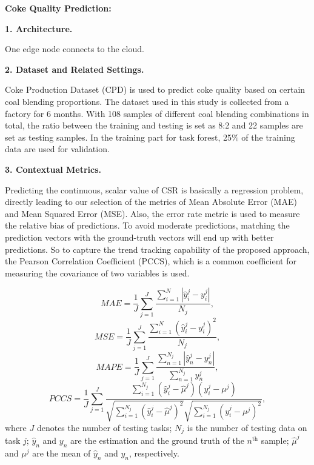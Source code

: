 \textbf{Coke Quality Prediction:} 

\textbf{1. Architecture.}

One edge node connects to the cloud. 

\textbf{2. Dataset and Related Settings.}

Coke Production Dataset (CPD) is used to predict coke quality based on certain coal blending proportions. The dataset used in this study is collected from a factory for 6 months. With 108 samples of different coal blending combinations in total, the ratio between the training and testing is set as 8:2 and 22 samples are set as testing samples. In the training part for task forest, 25$\%$ of the training data are used for validation. 

\textbf{3. Contextual Metrics.} 

Predicting the continuous, scalar value of CSR is basically a regression problem, directly leading to our selection of the metrics of Mean Absolute Error (MAE) and Mean Squared Error (MSE). Also, the error rate metric is used to measure the relative bias of predictions. 
To avoid moderate predictions, matching the prediction vectors with the ground-truth vectors will end up with better predictions.
So to capture the trend tracking capability of the proposed approach, the Pearson Correlation Coefficient (PCCS), which is a common coefficient for measuring the covariance of two variables is used.

\begin{equation} \label{equ:mae} 
MAE = \frac{1}{J} \sum^J_{j=1} \frac{\sum_{i=1}^N |\hat{y}^{j}_{i} - y^{j}_{i}|}{N_j}, 
\end{equation}
\begin{equation} \label{equ:mse} 
MSE = \frac{1}{J} \sum^J_{j=1} \frac{\sum_{i=1}^N (\hat{y}^{j}_{i} - y^{j}_{i})^2}{N_j},
\end{equation}
\begin{equation} \label{equ:er} 
MAPE = \frac{1}{J} \sum^J_{j=1} \frac{\sum_{n=1}^{N_j} |\hat{y}^j_n - y^j_n|}{\sum_{n=1}^{N_j} y^j_n}, 
\end{equation}
\begin{equation} \label{equ:pccs} 
PCCS = \frac{1}{J} \sum^J_{j=1} \frac{\sum_{i=1}^{N_j} (\hat{y}^{j}_{i} - \hat{\mu}^j)(y^{j}_{i} - \mu^j)}{\sqrt{\sum_{i=1}^{N_j} (\hat{y}^{j}_{i} - \hat{\mu}^j)^2}\sqrt{\sum_{i=1}^{N_j}(y^{j}_{i} - \mu^j)^2}},
\end{equation}
where $J$ denotes the number of testing tasks; $N_j$ is the number of testing data on task $j$; $\hat{y}_n$ and $y_n$ are the estimation and the ground truth of the $n^\text{th}$ sample; $\hat{\mu}^j$ and $\mu^j$ are the mean of $\hat{y}_n$ and $y_n$, respectively.

